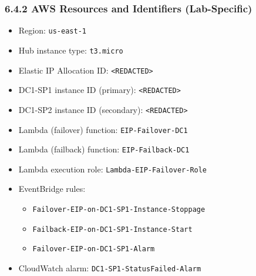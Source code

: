 \documentclass[11pt]{article}
\begin{document}
%
%
%
\subsubsection{6.4.2 AWS Resources and Identifiers (Lab-Specific)}

\begin{itemize}
  \item Region: \texttt{us-east-1}
  \item Hub instance type: \texttt{t3.micro}
  \item Elastic IP Allocation ID: \texttt{<REDACTED>}
  \item DC1-SP1 instance ID (primary): \texttt{<REDACTED>}
  \item DC1-SP2 instance ID (secondary): \texttt{<REDACTED>}
  \item Lambda (failover) function: \texttt{EIP-Failover-DC1}
  \item Lambda (failback) function: \texttt{EIP-Failback-DC1}
  \item Lambda execution role: \texttt{Lambda-EIP-Failover-Role}
  \item EventBridge rules:
    \begin{itemize}
      \item \texttt{Failover-EIP-on-DC1-SP1-Instance-Stoppage}
      \item \texttt{Failback-EIP-on-DC1-SP1-Instance-Start}
      \item \texttt{Failover-EIP-on-DC1-SP1-Alarm}
    \end{itemize}
  \item CloudWatch alarm: \texttt{DC1-SP1-StatusFailed-Alarm}
\end{itemize}

%
%
%
\end{document}
